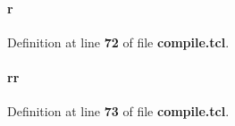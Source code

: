 \paragraph[{r}]{\setlength{\rightskip}{0pt plus 5cm}r}\label{rx__path__top_2rx__path_2compile_8tcl_a514f1b439f404f86f77090fa9edc96ce}


Definition at line {\bf 72} of file {\bf compile.\+tcl}.

\paragraph[{rr}]{\setlength{\rightskip}{0pt plus 5cm}rr}\label{rx__path__top_2rx__path_2compile_8tcl_aeb9279982226a42afdf2860dbdc29b45}


Definition at line {\bf 73} of file {\bf compile.\+tcl}.

